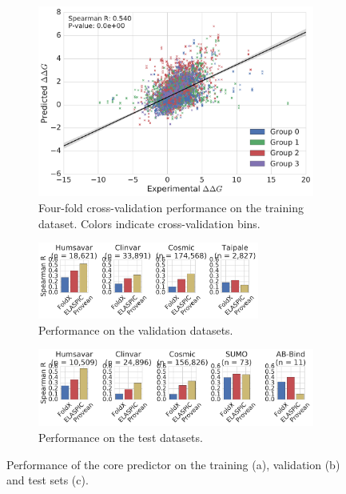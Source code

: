 \begin{figure}[ht]

	\begin{subfigure}[b]{1.0\textwidth}
		\centering
		\includegraphics[width=0.6\linewidth]{static/elaspic_training_set/validation/crossvalidation_performance_core.pdf}
		\caption{Four-fold cross-validation performance on the training dataset. Colors indicate cross-validation bins.}
		\vspace*{10mm}
	\end{subfigure}

	\begin{subfigure}[b]{1.0\textwidth}
		\centering
		\includegraphics[width=0.8\textwidth]{static/elaspic_training_set/validation/validation_performance_core.pdf}
		\caption{Performance on the validation datasets.}
		\vspace*{10mm}
	\end{subfigure}

	\begin{subfigure}[b]{1.0\textwidth}
		\centering
		\includegraphics[width=1.0\textwidth]{static/elaspic_training_set/validation/test_performance_core.pdf}
		\caption{Performance on the test datasets.}
	\end{subfigure}

	\caption{Performance of the core predictor on the training (a), validation (b) and test sets (c).}
\end{figure}


